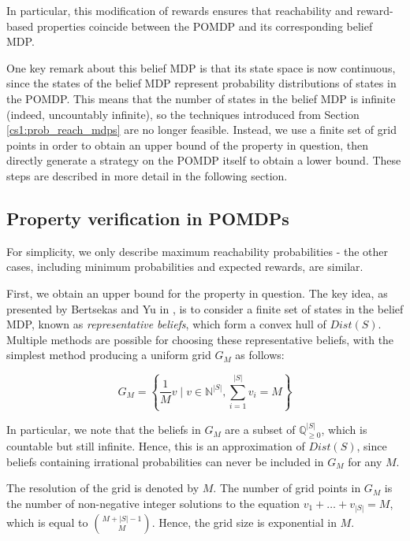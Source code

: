 In particular, this modification of rewards ensures that reachability and reward-based properties coincide between the POMDP and its corresponding belief MDP.

One key remark about this belief MDP is that its state space is now continuous, since the states of the belief MDP represent probability distributions of states in the POMDP. This means that the number of states in the belief MDP is infinite (indeed, uncountably infinite), so the techniques introduced from Section \ref{cs1:prob_reach_mdps} are no longer feasible. Instead, we use a finite set of grid points in order to obtain an upper bound of the property in question, then directly generate a strategy on the POMDP itself to obtain a lower bound. These steps are described in more detail in the following section.

\subsection{Property verification in POMDPs}
\label{cs2:properties_pomdps}

For simplicity, we only describe maximum reachability probabilities - the other cases, including minimum probabilities and expected rewards, are similar.

First, we obtain an upper bound for the property in question. The key idea, as presented by Bertsekas and Yu in \cite{bertsekas_approximate_2006}, is to consider a finite set of states in the belief MDP, known as \emph{representative beliefs}, which form a convex hull of $Dist(S)$. Multiple methods are possible for choosing these representative beliefs, with the simplest method producing a uniform grid $G_M$ as follows:

\begin{equation*}
    G_M = \left\{\frac{1}{M} v \; | \; v \in \mathbb{N}^{|S|} , \sum_{i=1}^{|S|} v_i = M \right\}
\end{equation*}

In particular, we note that the beliefs in $G_M$ are a subset of $\mathbb{Q}_{\geq 0}^{|S|}$, which is countable but still infinite. Hence, this is an approximation of $Dist(S)$, since beliefs containing irrational probabilities can never be included in $G_M$ for any $M$.

The resolution of the grid is denoted by $M$. The number of grid points in $G_M$ is the number of non-negative integer solutions to the equation $v_1 + \dots + v_{|S|} = M$, which is equal to ${M + |S| - 1 \choose M}$. Hence, the grid size is exponential in $M$.

